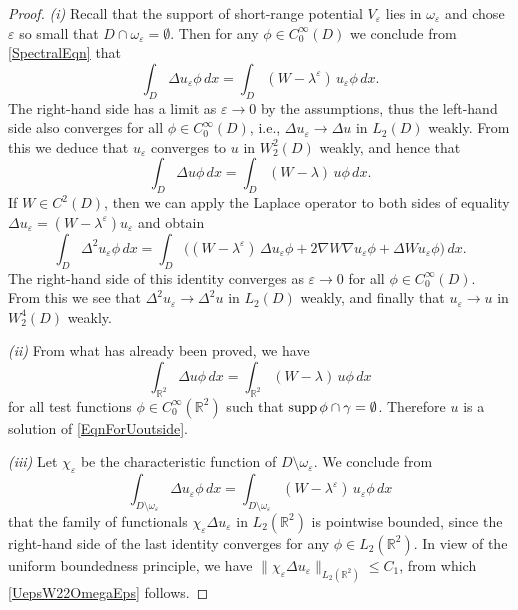 \documentclass[reqno]{amsart}
\theoremstyle{plain}
\numberwithin{equation}{section}
\newcommand{\supp}{\mathop{\rm supp}}
\newcommand{\Real}{\mathbb R}
\newcommand{\eps}{\varepsilon}
\renewcommand{\leq}{\leqslant}
\begin{document}
\begin{proof}
\textit{(i)} Recall that the support of short-range potential $V_\eps$ lies in $\omega_\eps$ and chose $\eps$  so small that $D\cap \omega_\eps=\emptyset$. Then for any $\phi\in C_0^\infty(D)$ we conclude from \eqref{SpectralEqn} that
 \begin{equation*}
    \int_{D} \Delta u_\eps\phi\,dx=\int_{D} (W-\lambda^\eps)\, u_\eps\phi\,dx.
  \end{equation*}
The right-hand side  has a limit as $\eps\to 0$ by the assumptions, thus the left-hand side also converges for all $\phi\in C_0^\infty(D)$, i.e., $\Delta u_\eps\to \Delta u$ in $L_2(D)$ weakly. From this we deduce that $u_\eps$ converges to $u$ in  $W_2^2(D)$ weakly, and hence that
 \begin{equation*}
    \int_{D} \Delta u\phi\,dx=\int_{D} (W-\lambda)\,u\phi\,dx.
  \end{equation*}
If $W\in C^2(D)$, then we can apply the Laplace operator to both sides of equality $\Delta u_\eps=(W-\lambda^\eps)u_\eps$  and obtain
 \begin{equation*}
    \int_{D} \Delta^2 u_\eps\phi\,dx=\int_{D} \big((W-\lambda^\eps)\,\Delta u_\eps\phi+2\nabla W\nabla u_\eps\phi+\Delta W u_\eps\phi\big)\,dx.
  \end{equation*}
The right-hand side of this identity  converges as $\eps\to 0$ for all $\phi\in C_0^\infty(D)$. From this we see that $\Delta^2 u_\eps\to \Delta^2 u$ in $L_2(D)$ weakly, and finally that $u_\eps\to u$ in  $W_2^4(D)$ weakly.

\textit{(ii)} From what has already been proved, we have
  \begin{equation*}
    \int_{\Real^2} \Delta u\phi\,dx=\int_{\Real^2} (W-\lambda)\,u\phi\,dx
  \end{equation*}
for all test functions $\phi\in C^\infty_0(\Real^2)$ such that $\supp \phi\cap\gamma=\emptyset$.
Therefore $u$ is a solution of \eqref{EqnForUoutside}.



\textit{(iii)}
Let $\chi_{\eps}$ be the characteristic function of $D\setminus\omega_\eps$.
We conclude from
 \begin{equation*}
 \int_{D\setminus\omega_\eps} \Delta u_\eps\phi\,dx=\int_{D\setminus\omega_\eps} (W-\lambda^\eps)\,u_\eps\phi\,dx
  \end{equation*}
that the family of functionals $\chi_\eps \Delta u_\eps$ in $L_2(\Real^2)$
is pointwise bounded, since the right-hand side of the last identity converges for any $\phi\in L_2(\Real^2)$. In view of  the uniform boundedness principle, we have $\|\chi_\eps \Delta u_\eps\|_{L_2(\Real^2)}\leq C_1$,
from which \eqref{UepsW22OmegaEps} follows.


\end{proof}
\end{document}
